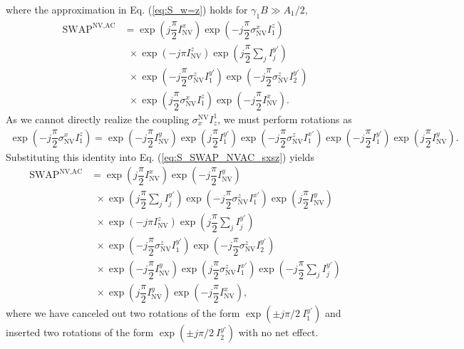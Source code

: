\documentclass[twocolumn]{revtex4-1}
\renewcommand{\t}{\text} %
\newcommand{\f}[2]{\dfrac{#1}{#2}} %
\newcommand{\p}[1]{\left(#1\right)} %
\newcommand{\SWAP}{\t{SWAP}}
\newcommand{\NV}{\t{NV}}
\newcommand{\AC}{\t{AC}}
\begin{document}
where the approximation in Eq. (\ref{eq:S_w=z}) holds for
$\gamma_1B\gg A_1/2$,
\begin{align}
  \SWAP^{\NV,\AC}
  &= \exp\p{j\f\pi2 I_\NV^x}
    \exp\p{-j\f\pi2 \sigma_\NV^x I_1^z} \tag*{} \\
  &~~\times \exp\p{-j\pi I_\NV^z}
    \exp\p{j\f\pi2\sum_jI_j^{y'}} \tag*{} \\
  &~~\times \exp\p{-j\f\pi2 \sigma_\NV^z I_1^{y'}}
    \exp\p{-j\f\pi2 \sigma_\NV^z I_2^{y'}} \tag*{} \\
  &~~\times \exp\p{j\f\pi2 \sigma_\NV^x I_1^z} \exp\p{-j\f\pi2 I_\NV^x}.
    \label{eq:S_SWAP_NVAC_sxsz}
\end{align}
As we cannot directly realize the coupling $\sigma_x^\NV I_z^1$, we
must perform rotations as
\begin{align}
  \exp\p{-j\f\pi2 \sigma_\NV^x I_1^z}
  = \exp\p{-j\f\pi2 I_\NV^y} \exp\p{j\f\pi2 I_1^{y'}}
  \exp\p{-j\f\pi2 \sigma_\NV^z I_1^{x'}}
  \exp\p{-j\f\pi2 I_1^{y'}} \exp\p{j\f\pi2 I_\NV^y}.
\end{align}
Substituting this identity into Eq. (\ref{eq:S_SWAP_NVAC_sxsz}) yields
\begin{align}
  \SWAP^{\NV,\AC}
  &= \exp\p{j\f\pi2 I_\NV^x} \exp\p{-j\f\pi2 I_\NV^y} \tag*{} \\
  &~~\times \exp\p{j\f\pi2\sum_jI_j^{y'}}
    \exp\p{-j\f\pi2 \sigma_\NV^z I_1^{x'}}
    \exp\p{j\f\pi2 I_\NV^y} \tag*{} \\
  &~~\times \exp\p{-j\pi I_\NV^z}
    \exp\p{j\f\pi2\sum_jI_j^{y'}} \tag*{} \\
  &~~\times \exp\p{-j\f\pi2 \sigma_\NV^z I_1^{y'}}
    \exp\p{-j\f\pi2 \sigma_\NV^z I_2^{y'}} \tag*{} \\
  &~~\times \exp\p{-j\f\pi2 I_\NV^y}
    \exp\p{j\f\pi2 \sigma_\NV^z I_1^{x'}}
    \exp\p{-j\f\pi2\sum_jI_j^{y'}} \tag*{} \\
  &~~\times \exp\p{j\f\pi2 I_\NV^y} \exp\p{-j\f\pi2 I_\NV^x},
    \label{eq:S_SWAP_NVAC}
\end{align}
where we have canceled out two rotations of the form
$\exp\p{\pm j\pi/2~I_1^{y'}}$ and inserted two rotations of the form
$\exp\p{\pm j\pi/2~I_2^{y'}}$ with no net effect.
\end{document}
